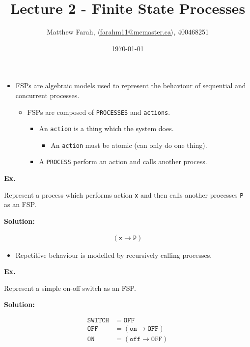 \documentclass{article}
\title{Lecture 2 - Finite State Processes}
\author{Matthew Farah, \href{mailto:farahm11@mcmaster.ca}{$\langle$farahm11@mcmaster.ca$\rangle$}, 400468251}
\date{\today}
\newenvironment{example}[1][]{
	\vspace{1em}
	\large{\par\noindent\textbf{Ex.}}
}{\vspace{2.5em}}
\newenvironment{solution}[1][]{
	\par\noindent\textbf{\large{Solution:}}
	\par
	\vspace{1.5em}
}{\vspace{.5em}}
\begin{document}
\maketitle
\pagestyle{fancy}

\fi

\begin{itemize}
	\item FSPs are algebraic models used to represent the behaviour of sequential and concurrent processes.
	\begin{itemize}
		\item FSPs are composed of \texttt{PROCESSES} and \texttt{actions}.
		\begin{itemize}
			\item An \texttt{action} is a thing which the system does.
			\begin{itemize}
				\item An \texttt{action} must be atomic (can only do one thing).
			\end{itemize}
			\item A \texttt{PROCESS} perform an action and calls another process.
		\end{itemize}
	\end{itemize}
\end{itemize}

\begin{example}
	Represent a process which performs action \texttt{x} and then calls another processes \texttt{P} as an FSP.
\end{example}

\begin{solution}
	\begin{align*}
		(\mathtt{x} \rightarrow \mathtt{P})
	\end{align*}
\end{solution}

\begin{itemize}
	\item Repetitive behaviour is modelled by recursively calling processes.
\end{itemize}

\begin{example}
	Represent a simple on-off switch as an FSP.
\end{example}

\begin{solution}
	\begin{align*}
		\mathtt{SWITCH} &= \mathtt{OFF} \\
		\mathtt{OFF} &= \left( \mathtt{on} \rightarrow \mathtt{OFF} \right) \\
		\mathtt{ON} &= \left( \mathtt{off} \rightarrow \mathtt{OFF} \right) \\
	\end{align*}
\end{solution}
\end{document}
